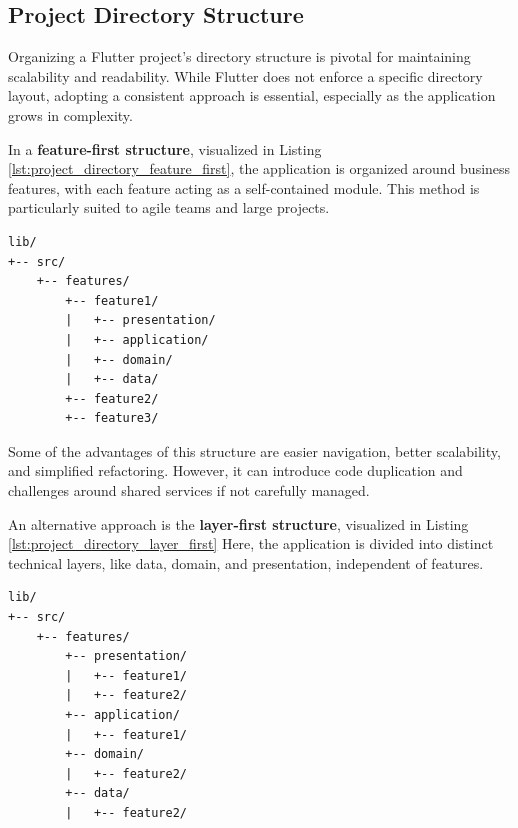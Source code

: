 \documentclass[
  digital,     %
  oneside,     %
  nosansbold,  %
  nocolorbold, %
  lof,         %
  lot,         %
]{fithesis4}
\begin{document}
\subsection{Project Directory Structure}
Organizing a Flutter project's directory structure is pivotal for maintaining scalability and readability. While Flutter does not enforce a specific directory layout, adopting a consistent approach is essential, especially as the application grows in complexity.

In a \textbf{feature-first structure}, visualized in Listing \ref{lst:project_directory_feature_first}, the application is organized around business features, with each feature acting as a self-contained module.  
This method is particularly suited to agile teams and large projects.

\begin{listing}
  
\begin{lstlisting}[caption={Feature-first directory structure}, label={lst:project_directory_feature_first}, floatplacement=H, showstringspaces=false, breaklines=false]
lib/
+-- src/
    +-- features/
        +-- feature1/
        |   +-- presentation/
        |   +-- application/
        |   +-- domain/
        |   +-- data/
        +-- feature2/
        +-- feature3/
\end{lstlisting}
\end{listing}

Some of the advantages of this structure are easier navigation, better scalability, and simplified refactoring.  
However, it can introduce code duplication and challenges around shared services if not carefully managed.

An alternative approach is the \textbf{layer-first structure}, visualized in Listing \ref{lst:project_directory_layer_first} Here, the application is divided into distinct technical layers, like data, domain, and presentation, independent of features.

\begin{listing}[H]
\centering
\begin{lstlisting}[caption={Layer-first directory structure}, label={lst:project_directory_layer_first}, floatplacement=H, showstringspaces=false]
lib/
+-- src/
    +-- features/
        +-- presentation/
        |   +-- feature1/
        |   +-- feature2/
        +-- application/
        |   +-- feature1/
        +-- domain/
        |   +-- feature2/
        +-- data/
        |   +-- feature2/
\end{lstlisting}
\end{listing}
\end{document}
